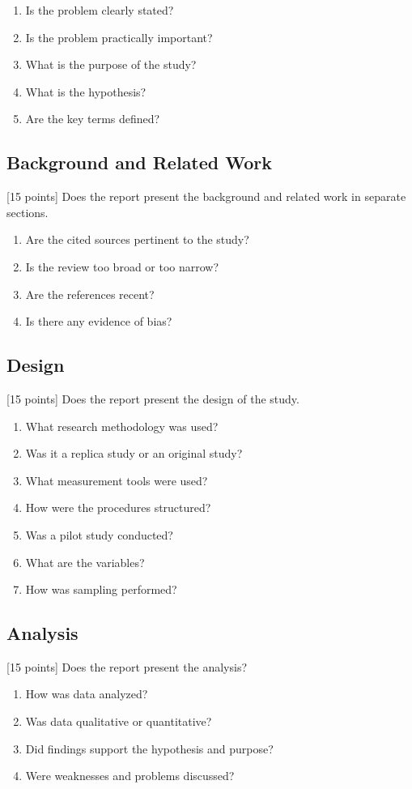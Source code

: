 \documentclass{winslabreport}
\begin{document}
\begin{enumerate}
    \item Is the problem clearly stated?
    \item Is the problem practically important?
    \item What is the purpose of the study?
    \item What is the hypothesis?
    \item Are the key terms defined?
\end{enumerate}


\subsection{Background and Related Work}
[15 points] Does the report present the background and related work in separate sections.

\begin{enumerate}
    \item Are the cited sources pertinent to the study?
    \item Is the review too broad or too narrow?
    \item Are the references recent?
    \item Is there any evidence of bias?
\end{enumerate}

\subsection{Design}
[15 points] Does the report present the design of the study.
\begin{enumerate}
    \item What research methodology was used?
    \item Was it a replica study or an original study?
    \item What measurement tools were used?
    \item How were the procedures structured?
    \item Was a pilot study conducted?
    \item What are the variables?
    \item How was sampling performed?
\end{enumerate}


\subsection{Analysis}
[15 points] Does the report present the analysis?
\begin{enumerate}
    \item How was data analyzed?
    \item Was data qualitative or quantitative?
    \item Did findings support the hypothesis and purpose?
    \item Were weaknesses and problems discussed?
\end{enumerate}
\end{document}
